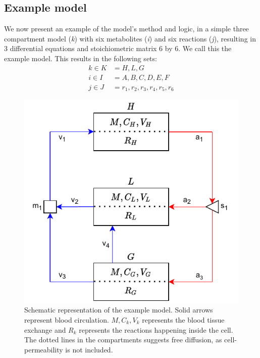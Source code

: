 \documentclass{IEEEtran}
\begin{document}


\subsection{Example model}

We now present an example of the model's method and logic, in a simple three compartment model (\textit{k}) with six metabolites (\textit{i}) and six reactions (\textit{j}), resulting in 3 differential equations and stoichiometric matrix 6 by 6. We call this the example model. This results in the following sets:
\begin{align*}
k \in K & =  H,L,G \\
i \in I & =  A, B, C, D, E, F \\
j \in J & =  r_1, r_2, r_3, r_4, r_5, r_6
\end{align*}


\begin{figure}[H]
    \centering
    \includegraphics[width=0.87\columnwidth]{Diagrams/example_diagram_v3.pdf}
    \caption{Schematic representation of the example model. Solid arrows represent blood circulation. $M,C_k,V_k$ represents the blood tissue exchange and $R_k$ represents the reactions happening inside the cell. The dotted lines in the compartments suggests free diffusion, as cell-permeability is not included.}
    \label{fig:example_flow}
\end{figure}
\end{document}

